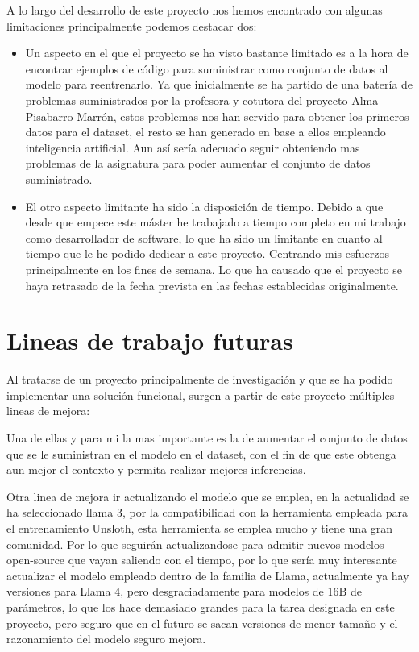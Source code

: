 A lo largo del desarrollo de este proyecto nos hemos encontrado con algunas limitaciones principalmente podemos destacar dos:

\begin{itemize}
    \item Un aspecto en el que el proyecto se ha visto bastante limitado es a la hora de encontrar ejemplos de código para suministrar como conjunto de datos al modelo para reentrenarlo. Ya que inicialmente se ha partido de una batería de problemas suministrados por la profesora y cotutora del proyecto Alma Pisabarro Marrón, estos problemas nos han servido para obtener los primeros datos para el dataset, el resto se han generado en base a ellos empleando inteligencia artificial. Aun así sería adecuado seguir obteniendo mas problemas de la asignatura para poder aumentar el conjunto de datos suministrado.

    \item El otro aspecto limitante ha sido la disposición de tiempo. Debido a que desde que empece este máster he trabajado a tiempo completo en mi trabajo como desarrollador de software, lo que ha sido un limitante en cuanto al tiempo que le he podido dedicar a este proyecto. Centrando mis esfuerzos principalmente en los fines de semana. Lo que ha causado que el proyecto se haya retrasado de la fecha prevista  en las fechas establecidas originalmente.
\end{itemize}

\section{Lineas de trabajo futuras}

Al tratarse de un proyecto principalmente de investigación y que se ha podido implementar una solución funcional, surgen a partir de este proyecto múltiples lineas de mejora:

Una de ellas y para mi la mas importante es la de aumentar el conjunto de datos que se le suministran en el modelo en el dataset, con el fin de que este obtenga aun mejor el contexto y permita realizar mejores inferencias.

 Otra linea de mejora ir actualizando el modelo que se emplea, en la actualidad se ha seleccionado llama 3, por la compatibilidad con la herramienta empleada para el entrenamiento Unsloth, esta herramienta se emplea mucho y tiene una gran comunidad. Por lo que seguirán actualizandose para admitir nuevos modelos open-source que vayan saliendo con el tiempo, por lo que sería muy interesante actualizar el modelo empleado dentro de la familia de Llama, actualmente ya hay versiones para Llama 4, pero desgraciadamente para modelos de 16B de parámetros, lo que los hace demasiado grandes para la tarea designada en este proyecto, pero seguro que en el futuro se sacan versiones de menor tamaño y el razonamiento del modelo seguro mejora.

